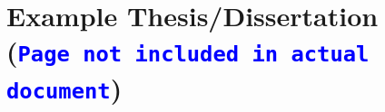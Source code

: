 \documentclass{./LaTeX/tex/latex/MastersDoctoralThesis}
\begin{document}
    
    \frontMatter
    
    \part*{Example Thesis/Dissertation \\{\large(\textcolor{blue}{\texttt{Page not included in actual document}})}} %
    
    
    \begin{center}
        \thesisTitle
        \copyrightpage
        \dissertationapproval
    \end{center}
    
%    
    \abstractPage
%    
%    
    \dedicationPage
%    
%    
    \frontispiecePage
%    
%    
    \epigraphPage
%    
%    
    \tableOfContents
%    
%    
   \NotationSymbolsPage
\end{document}
